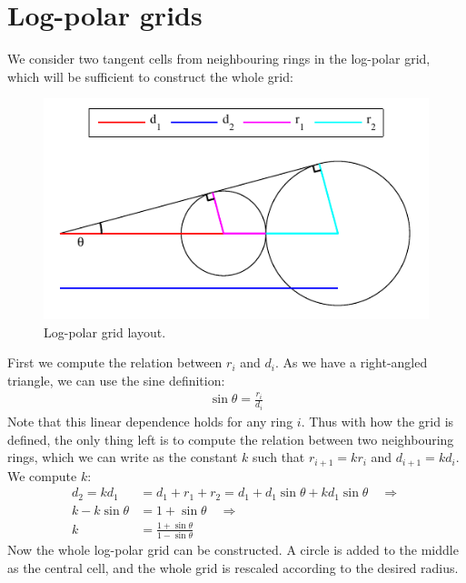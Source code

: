 \documentclass[thesis.tex]{subfiles}
\begin{document}
\section{Log-polar grids}
%
We consider two tangent cells from neighbouring rings in the log-polar grid, which will be sufficient to construct the whole grid:
%
\begin{figure}[H]
	\centering
	\includegraphics[width=\textwidth]{img/gridLayoutDerivationNormal.pdf}
   	\caption{Log-polar grid layout.}
  	\label{fig:gridLayoutDerivationNormal}
\end{figure}
\noindent
%
First we compute the relation between $r_i$ and $d_i$. As we have a right-angled triangle, we can use the sine definition:
%
\begin{align}
\sin \theta = \frac{r_i}{d_i}
\label{eq:radiusDistanceRelation}
\end{align}
%
Note that this linear dependence holds for any ring $i$. Thus with how the grid is defined, the only thing left is to compute the relation between two neighbouring rings, which we can write as the constant $k$ such that $r_{i+1} = k r_i$ and $d_{i+1} = k d_i$. We compute $k$:
%
\begin{align*}
d_2 = k d_1 &= d_1 + r_1 + r_2 = d_1 + d_1 \sin \theta + k d_1 \sin \theta \quad\Rightarrow \\
k - k \sin \theta &= 1 + \sin \theta \quad\Rightarrow \\
k &= \frac{1 + \sin \theta}{1 - \sin \theta}
\end{align*}
%
Now the whole log-polar grid can be constructed. A circle is added to the middle as the central cell, and the whole grid is rescaled according to the desired radius.
%
\end{document}
